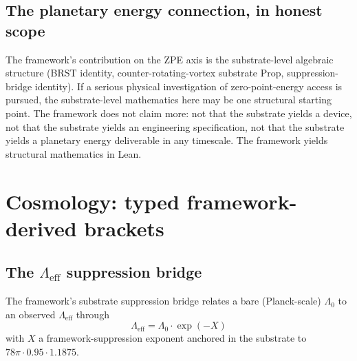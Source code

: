 \documentclass[11pt,a4paper]{article}
\theoremstyle{plain}
\theoremstyle{definition}
\begin{document}
\noindent{}

\subsection{The planetary energy connection, in honest scope}
\label{sec:planetary-energy}

The framework's contribution on the ZPE axis is the substrate-level
algebraic structure (BRST identity, counter-rotating-vortex
substrate Prop, suppression-bridge identity). If a serious physical
investigation of zero-point-energy access is pursued, the
substrate-level mathematics here may be one structural starting
point. The framework does not claim more: not that the substrate
yields a device, not that the substrate yields an engineering
specification, not that the substrate yields a planetary energy
deliverable in any timescale. The framework yields structural
mathematics in Lean.

\section{Cosmology: typed framework-derived brackets}
\label{sec:cosmology}

\subsection{The $\Lambda_{\mathrm{eff}}$ suppression bridge}
\label{sec:lambda-eff}

The framework's substrate suppression bridge relates a bare
(Planck-scale) $\Lambda_{0}$ to an observed $\Lambda_{\mathrm{eff}}$
through
\[
\Lambda_{\mathrm{eff}} = \Lambda_{0} \cdot \exp(-X)
\]
with $X$ a framework-suppression exponent anchored in the substrate
to $78\pi \cdot 0.95 \cdot 1.1875$.
\end{document}
